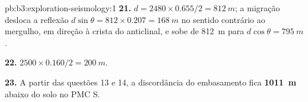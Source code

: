 \begin{solution}{pb:b3:exploration-seismology:1}
\textbf{21.} $d = 2480\times0.655/2 = \qty{812}{m}$; a migração desloca a
reflexão $d\sin\theta = 812\times0.207 = \qty{168}{m}$ no sentido contrário ao mergulho, em direção à
crista do anticlinal, e sobe de \qty{812}{m} para $d\cos\theta =
\qty{795}{m}$.

\textbf{22.} $2500\times0.160/2 = \qty{200}{m}$.

\textbf{23.} A partir das questões 13 e 14, a discordância do embasamento fica
\textbf{\qty[text-series-to-math=true]{1011}{m}} abaixo do solo no PMC S.
\end{solution}
